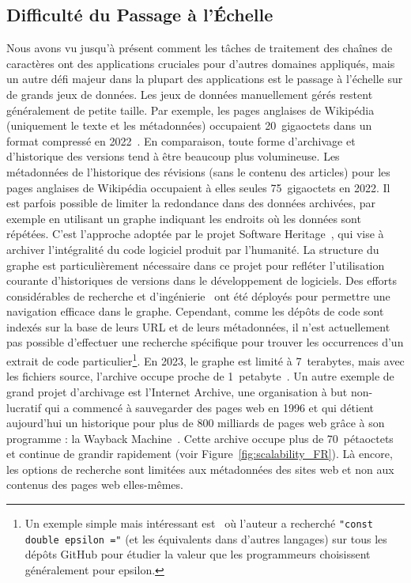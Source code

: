\subsection*{Difficulté du Passage à l'Échelle}

Nous avons vu jusqu'à présent comment les tâches de traitement des chaînes de caractères ont des applications cruciales pour d'autres domaines appliqués, mais un autre défi majeur dans la plupart des applications est le passage à l'échelle sur de grands jeux de données.
Les jeux de données manuellement gérés restent généralement de petite taille. Par exemple, les pages anglaises de Wikipédia (uniquement le texte et les métadonnées) occupaient 20~gigaoctets dans un format compressé en 2022~\cite{wikimedia}. En comparaison, toute forme d'archivage et d'historique des versions tend à être beaucoup plus volumineuse. Les métadonnées de l'historique des révisions (sans le contenu des articles) pour les pages anglaises de Wikipédia occupaient à elles seules 75~gigaoctets en 2022.
Il est parfois possible de limiter la redondance dans des données archivées, par exemple en utilisant un graphe indiquant les endroits où les données sont répétées. C'est l'approche adoptée par le projet Software Heritage~\cite{swh-site}, qui vise à archiver l'intégralité du code logiciel produit par l'humanité. La structure du graphe est particulièrement nécessaire dans ce projet pour refléter l'utilisation courante d'historiques de versions dans le développement de logiciels.
Des efforts considérables de recherche et d'ingénierie~\cite{DBLP:phd/hal/Pietri21} ont été déployés pour permettre une navigation efficace dans le graphe. 
Cependant, comme les dépôts de code sont indexés sur la base de leurs URL et de leurs métadonnées, il n'est actuellement pas possible d'effectuer une recherche spécifique pour trouver les occurrences d'un extrait de code particulier\footnote{\setlength\parindent{10pt} Un exemple simple mais intéressant est~\cite{vii2014if} où l'auteur a recherché \texttt{"const double epsilon ="} (et les équivalents dans d'autres langages) sur tous les dépôts GitHub pour étudier la valeur que les programmeurs choisissent généralement pour epsilon.}.
En 2023, le graphe est limité à 7~terabytes, mais avec les fichiers source, l'archive occupe proche de 1~petabyte~\cite{swh-polytechnique}.
Un autre exemple de grand projet d'archivage est l'Internet Archive, une organisation à but non-lucratif qui a commencé à sauvegarder des pages web en 1996 et qui détient aujourd'hui un historique pour plus de 800 milliards de pages web grâce à son programme : la Wayback Machine~\cite{web-archive}. Cette archive occupe plus de 70~pétaoctets et continue de grandir rapidement (voir Figure~\ref{fig:scalability_FR}).
Là encore, les options de recherche sont limitées aux métadonnées des sites web et non aux contenus des pages web elles-mêmes.

